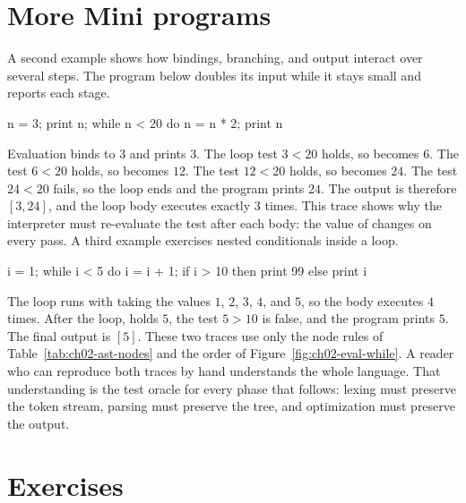 \section{More Mini programs}
\label{sec:ch02-more-programs}

A second example shows how bindings, branching, and output interact over several steps.
The program below doubles its input while it stays small and reports each stage.
\begin{irlisting}
n = 3;
print n;
while n < 20 do n = n * 2;
print n
\end{irlisting}
Evaluation binds  to $3$ and prints $3$.
The loop test $3 < 20$ holds, so  becomes $6$.
The test $6 < 20$ holds, so  becomes $12$.
The test $12 < 20$ holds, so  becomes $24$.
The test $24 < 20$ fails, so the loop ends and the program prints $24$.
The output is therefore $[3, 24]$, and the loop body executes exactly $3$ times.
This trace shows why the interpreter must re-evaluate the test after each body: the value of  changes on every pass.
A third example exercises nested conditionals inside a loop.
\begin{irlisting}
i = 1;
while i < 5 do i = i + 1;
if i > 10 then print 99 else print i
\end{irlisting}
The loop runs with  taking the values $1$, $2$, $3$, $4$, and $5$, so the body executes $4$ times.
After the loop,  holds $5$, the test $5 > 10$ is false, and the program prints $5$.
The final output is $[5]$.
These two traces use only the node rules of Table~\ref{tab:ch02-ast-nodes} and the order of Figure~\ref{fig:ch02-eval-while}.
A reader who can reproduce both traces by hand understands the whole language.
That understanding is the test oracle for every phase that follows: lexing must preserve the token stream, parsing must preserve the tree, and optimization must preserve the output.

\section{Exercises}
\label{sec:ch02-exercises}

